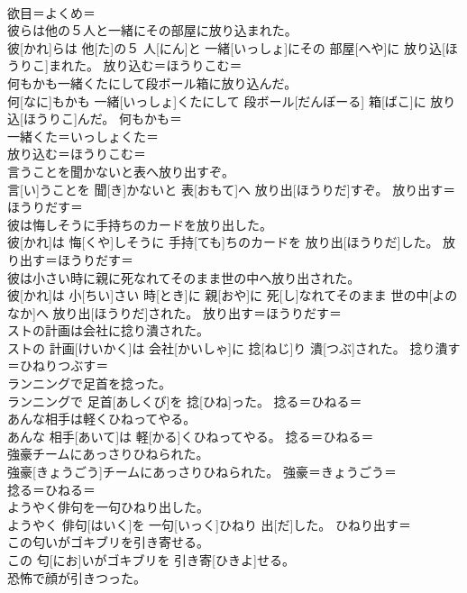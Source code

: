 \documentclass[8pt]{extreport}
\begin{document}
\begin{CJK}{UTF8}{min}
\\	欲目＝よくめ＝ 
\\	彼らは他の５人と一緒にその部屋に放り込まれた。	
\\	彼[かれ]らは 他[た]の５ 人[にん]と 一緒[いっしょ]にその 部屋[へや]に 放り込[ほうりこ]まれた。	放り込む＝ほうりこむ＝ 
\\	何もかも一緒くたにして段ボール箱に放り込んだ。	
\\	何[なに]もかも 一緒[いっしょ]くたにして 段ボール[だんぼーる] 箱[ばこ]に 放り込[ほうりこ]んだ。	何もかも＝ 
\\	一緒くた＝いっしょくた＝ 
\\	放り込む＝ほうりこむ＝ 
\\	言うことを聞かないと表へ放り出すぞ。	
\\	言[い]うことを 聞[き]かないと 表[おもて]へ 放り出[ほうりだ]すぞ。	放り出す＝ほうりだす＝ 
\\	彼は悔しそうに手持ちのカードを放り出した。	
\\	彼[かれ]は 悔[くや]しそうに 手持[ても]ちのカードを 放り出[ほうりだ]した。	放り出す＝ほうりだす＝ 
\\	彼は小さい時に親に死なれてそのまま世の中へ放り出された。	
\\	彼[かれ]は 小[ちい]さい 時[とき]に 親[おや]に 死[し]なれてそのまま 世の中[よのなか]へ 放り出[ほうりだ]された。	放り出す＝ほうりだす＝ 
\\	ストの計画は会社に捻り潰された。	
\\	ストの 計画[けいかく]は 会社[かいしゃ]に 捻[ねじ]り 潰[つぶ]された。	捻り潰す＝ひねりつぶす＝ 
\\	ランニングで足首を捻った。	
\\	ランニングで 足首[あしくび]を 捻[ひね]った。	捻る＝ひねる＝ 
\\	あんな相手は軽くひねってやる。	
\\	あんな 相手[あいて]は 軽[かる]くひねってやる。	捻る＝ひねる＝ 
\\	強豪チームにあっさりひねられた。	
\\	強豪[きょうごう]チームにあっさりひねられた。	強豪＝きょうごう＝ 
\\	捻る＝ひねる＝ 
\\	ようやく俳句を一句ひねり出した。	
\\	ようやく 俳句[はいく]を 一句[いっく]ひねり 出[だ]した。	ひねり出す＝ 
\\	この匂いがゴキブリを引き寄せる。	
\\	この 匂[にお]いがゴキブリを 引き寄[ひきよ]せる。	
\\	恐怖で顔が引きつった。	

\end{CJK}
\end{document}
